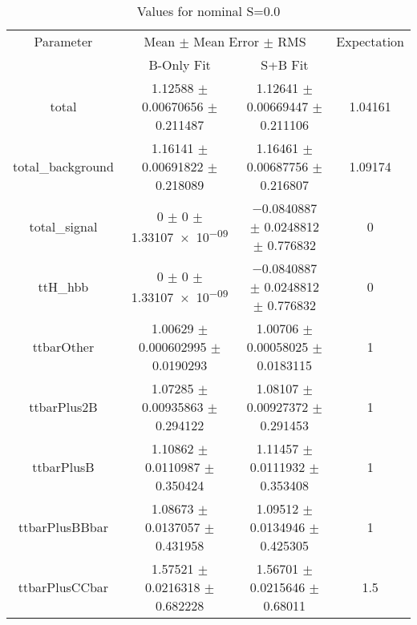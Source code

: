 \begin{table}
\centering
\caption{Values for nominal S=0.0}
\begin{tabular}{cccc}
\toprule
Parameter & \multicolumn{2}{c}{Mean $\pm$ Mean Error $\pm$ RMS} & Expectation\\
 & B-Only Fit & S+B Fit & \\
\midrule
total & \num{1.12588} $\pm$ \num{0.00670656} $\pm$ \num{0.211487} & \num{1.12641} $\pm$ \num{0.00669447} $\pm$ \num{0.211106} & \num{1.04161}\\
total\_background & \num{1.16141} $\pm$ \num{0.00691822} $\pm$ \num{0.218089} & \num{1.16461} $\pm$ \num{0.00687756} $\pm$ \num{0.216807} & \num{1.09174}\\
total\_signal & \num{0} $\pm$ \num{0} $\pm$ \num{1.33107e-09} & \num{-0.0840887} $\pm$ \num{0.0248812} $\pm$ \num{0.776832} & \num{0}\\
ttH\_hbb & \num{0} $\pm$ \num{0} $\pm$ \num{1.33107e-09} & \num{-0.0840887} $\pm$ \num{0.0248812} $\pm$ \num{0.776832} & \num{0}\\
ttbarOther & \num{1.00629} $\pm$ \num{0.000602995} $\pm$ \num{0.0190293} & \num{1.00706} $\pm$ \num{0.00058025} $\pm$ \num{0.0183115} & \num{1}\\
ttbarPlus2B & \num{1.07285} $\pm$ \num{0.00935863} $\pm$ \num{0.294122} & \num{1.08107} $\pm$ \num{0.00927372} $\pm$ \num{0.291453} & \num{1}\\
ttbarPlusB & \num{1.10862} $\pm$ \num{0.0110987} $\pm$ \num{0.350424} & \num{1.11457} $\pm$ \num{0.0111932} $\pm$ \num{0.353408} & \num{1}\\
ttbarPlusBBbar & \num{1.08673} $\pm$ \num{0.0137057} $\pm$ \num{0.431958} & \num{1.09512} $\pm$ \num{0.0134946} $\pm$ \num{0.425305} & \num{1}\\
ttbarPlusCCbar & \num{1.57521} $\pm$ \num{0.0216318} $\pm$ \num{0.682228} & \num{1.56701} $\pm$ \num{0.0215646} $\pm$ \num{0.68011} & \num{1.5}\\
\bottomrule
\end{tabular}
\end{table}